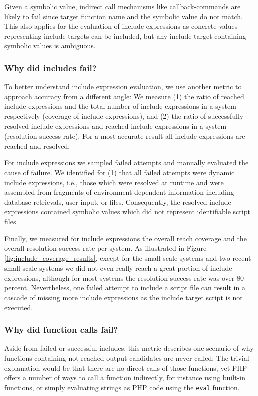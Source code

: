 \documentclass[sigconf]{acmart}
\begin{document}
Given a symbolic value, indirect call mechanisms like callback-commands are
likely to fail since target function name and the symbolic value do not match.
This also applies for the evaluation of include expressions as concrete values
representing include targets can be included, but any include target containing
symbolic values is ambiguous.

\subsubsection{Why did includes fail?}
\label{WhyDidIncludesFail}
To better understand include expression evaluation, we use another metric to
approach accuracy from a different angle: We measure (1) the ratio of reached
include expressions and the total number of include expressions in a system
respectively (coverage of include expressions), and (2) the ratio of
successfully resolved include expressions and reached include expressions in a
system (resolution success rate). For a most accurate result all include
expressions are reached and resolved.

For include expressions we sampled failed attempts and manually evaluated the
cause of failure. We identified for (1) that all failed attempts were dynamic
include expressions, i.e., those which were resolved at runtime and were
assembled from fragments of environment-dependent information including
database retrievals, user input, or files. Consequently, the resolved include
expressions contained symbolic values which did not represent identifiable
script files.

Finally, we measured for include expressions the overall reach coverage and the
overall resolution success rate per system. As illustrated in Figure
\ref{fig:include_coverage_results}, except for the small-scale systems and two
recent small-scale systems we did not even really reach a great portion of
include expressions, although for most systems the resolution success rate was
over 80 percent. Nevertheless, one failed attempt to include a script file can
result in a cascade of missing more include expressions as the include target
script is not executed.

\subsubsection{Why did function calls fail?}
\label{WhyDidFunctionCallsFail}
Aside from failed or successful includes, this metric describes one scenario of
why functions containing not-reached output candidates are never called: The
trivial explanation would be that there are no direct calls of those functions,
yet PHP offers a number of ways to call a function indirectly, for instance
using built-in functions, or simply evaluating strings as PHP code using the
\texttt{eval} function.
\end{document}
